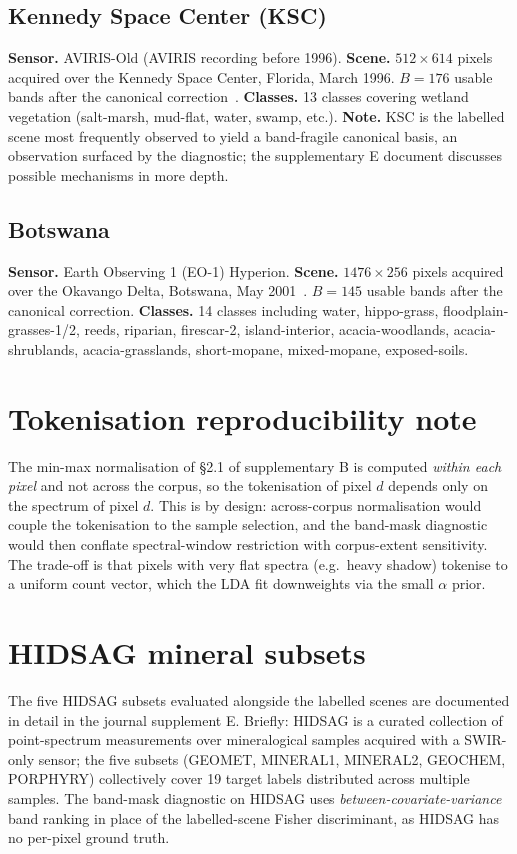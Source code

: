 \documentclass[11pt,a4paper]{article}
\begin{document}
\subsection{Kennedy Space Center (KSC)}
\textbf{Sensor.} AVIRIS-Old (AVIRIS recording before 1996).
\textbf{Scene.} $512 \times 614$ pixels acquired over the Kennedy
Space Center, Florida, March 1996. $B = 176$ usable bands after the
canonical correction~\cite{aviris_ksc}.
\textbf{Classes.} 13 classes covering wetland vegetation
(salt-marsh, mud-flat, water, swamp, etc.).
\textbf{Note.} KSC is the labelled scene most frequently observed to
yield a band-fragile canonical basis, an observation surfaced by the
diagnostic; the supplementary E document discusses possible
mechanisms in more depth.

\subsection{Botswana}
\textbf{Sensor.} Earth Observing 1 (EO-1) Hyperion.
\textbf{Scene.} $1476 \times 256$ pixels acquired over the Okavango
Delta, Botswana, May 2001~\cite{eo1_botswana}. $B = 145$ usable bands
after the canonical correction.
\textbf{Classes.} 14 classes including water, hippo-grass,
floodplain-grasses-1/2, reeds, riparian, firescar-2, island-interior,
acacia-woodlands, acacia-shrublands, acacia-grasslands,
short-mopane, mixed-mopane, exposed-soils.

\section{Tokenisation reproducibility note}

The min-max normalisation of \S2.1 of supplementary B is computed
\emph{within each pixel} and not across the corpus, so the
tokenisation of pixel $d$ depends only on the spectrum of pixel $d$.
This is by design: across-corpus normalisation would couple the
tokenisation to the sample selection, and the band-mask diagnostic
would then conflate spectral-window restriction with corpus-extent
sensitivity. The trade-off is that pixels with very flat spectra
(e.g.\ heavy shadow) tokenise to a uniform count vector, which the
LDA fit downweights via the small $\alpha$ prior.

\section{HIDSAG mineral subsets}

The five HIDSAG subsets evaluated alongside the labelled scenes are
documented in detail in the journal supplement E. Briefly: HIDSAG is
a curated collection of point-spectrum measurements over
mineralogical samples acquired with a SWIR-only sensor; the five
subsets (GEOMET, MINERAL1, MINERAL2, GEOCHEM, PORPHYRY) collectively
cover 19 target labels distributed across multiple samples. The
band-mask diagnostic on HIDSAG uses \emph{between-covariate-variance}
band ranking in place of the labelled-scene Fisher discriminant, as
HIDSAG has no per-pixel ground truth.



\end{document}
